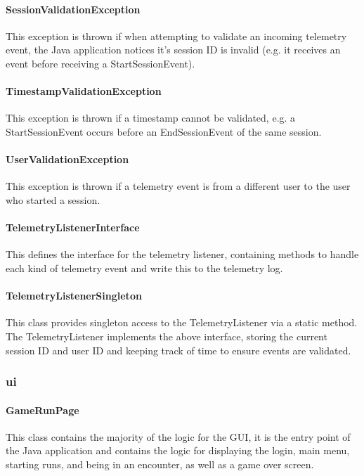 \documentclass[11pt]{article}
\begin{document}
\paragraph{SessionValidationException}
This exception is thrown if when attempting to validate an incoming telemetry event, the Java application notices it's session ID is invalid (e.g. it receives an event before receiving a StartSessionEvent).

\paragraph{TimestampValidationException}
This exception is thrown if a timestamp cannot be validated, e.g. a StartSessionEvent occurs before an EndSessionEvent of the same session. 

\paragraph{UserValidationException}
This exception is thrown if a telemetry event is from a different user to the user who started a session. 

\paragraph{TelemetryListenerInterface}
This defines the interface for the telemetry listener, containing methods to handle each kind of telemetry event and write this to the telemetry log. 

\paragraph{TelemetryListenerSingleton}
This class provides singleton access to the TelemetryListener via a static method. The TelemetryListener implements the above interface, storing the current session ID and user ID and keeping track of time to ensure events are validated. 

\subsubsection{ui}

\paragraph{GameRunPage}
This class contains the majority of the logic for the GUI, it is the entry point of the Java application and contains the logic for displaying the login, main menu, starting runs, and being in an encounter, as well as a game over screen. 
\end{document}
